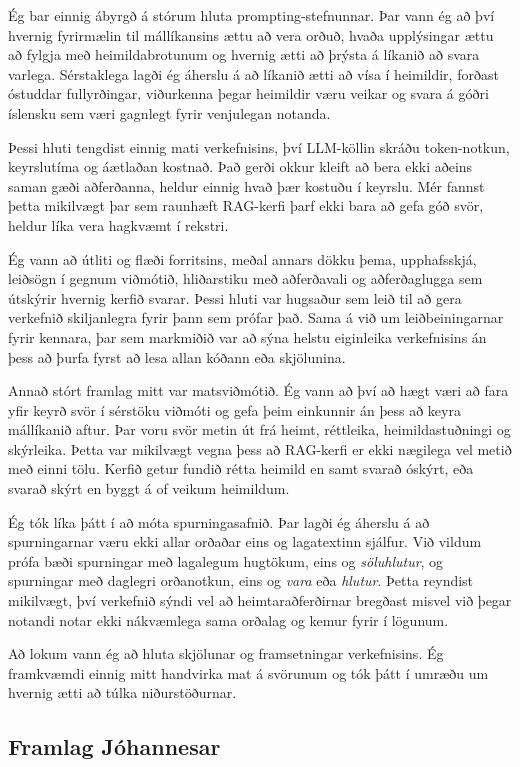 \documentclass[fleqn]{report}
\begin{document}
Ég bar einnig ábyrgð á stórum hluta prompting-stefnunnar. Þar vann ég að því hvernig fyrirmælin til mállíkansins ættu að vera orðuð, hvaða upplýsingar ættu að fylgja með heimildabrotunum og hvernig ætti að þrýsta á líkanið að svara varlega. Sérstaklega lagði ég áherslu á að líkanið ætti að vísa í heimildir, forðast óstuddar fullyrðingar, viðurkenna þegar heimildir væru veikar og svara á góðri íslensku sem væri gagnlegt fyrir venjulegan notanda.

Þessi hluti tengdist einnig mati verkefnisins, því LLM-köllin skráðu token-notkun, keyrslutíma og áætlaðan kostnað. Það gerði okkur kleift að bera ekki aðeins saman gæði aðferðanna, heldur einnig hvað þær kostuðu í keyrslu. Mér fannst þetta mikilvægt þar sem raunhæft RAG-kerfi þarf ekki bara að gefa góð svör, heldur líka vera hagkvæmt í rekstri.

Ég vann að útliti og flæði forritsins, meðal annars dökku þema, upphafsskjá, leiðsögn í gegnum viðmótið, hliðarstiku með aðferðavali og aðferðaglugga sem útskýrir hvernig kerfið svarar. Þessi hluti var hugsaður sem leið til að gera verkefnið skiljanlegra fyrir þann sem prófar það. Sama á við um leiðbeiningarnar fyrir kennara, þar sem markmiðið var að sýna helstu eiginleika verkefnisins án þess að þurfa fyrst að lesa allan kóðann eða skjölunina.

Annað stórt framlag mitt var matsviðmótið. Ég vann að því að hægt væri að fara yfir keyrð svör í sérstöku viðmóti og gefa þeim einkunnir án þess að keyra mállíkanið aftur. Þar voru svör metin út frá heimt, réttleika, heimildastuðningi og skýrleika. Þetta var mikilvægt vegna þess að RAG-kerfi er ekki nægilega vel metið með einni tölu. Kerfið getur fundið rétta heimild en samt svarað óskýrt, eða svarað skýrt en byggt á of veikum heimildum.

Ég tók líka þátt í að móta spurningasafnið. Þar lagði ég áherslu á að spurningarnar væru ekki allar orðaðar eins og lagatextinn sjálfur. Við vildum prófa bæði spurningar með lagalegum hugtökum, eins og \textit{söluhlutur}, og spurningar með daglegri orðanotkun, eins og \textit{vara} eða \textit{hlutur}. Þetta reyndist mikilvægt, því verkefnið sýndi vel að heimtaraðferðirnar bregðast misvel við þegar notandi notar ekki nákvæmlega sama orðalag og kemur fyrir í lögunum.

Að lokum vann ég að hluta skjölunar og framsetningar verkefnisins. Ég framkvæmdi einnig mitt handvirka mat á svörunum og tók þátt í umræðu um hvernig ætti að túlka niðurstöðurnar.


\subsection{Framlag Jóhannesar}
\end{document}
